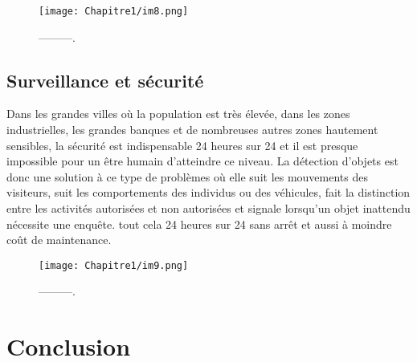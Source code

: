 \begin{figure}[H]
\centering
\texttt{[image: Chapitre1/im8.png]}
\caption{---------.}
\label{im8}
\end{figure}

\subsection{Surveillance et sécurité}
Dans les grandes villes où la population est très élevée, dans les zones industrielles, les grandes banques et de nombreuses autres zones hautement sensibles, la sécurité est indispensable 24 heures sur 24 et il est presque impossible pour un être humain d'atteindre ce niveau. La détection d'objets est donc une solution à ce type de problèmes où elle suit les mouvements des visiteurs, suit les comportements des individus ou des véhicules, fait la distinction entre les activités autorisées et non autorisées et signale lorsqu'un objet inattendu nécessite une enquête. tout cela 24 heures sur 24 sans arrêt et
aussi à moindre coût de maintenance.

\begin{figure}[H]
\centering
\texttt{[image: Chapitre1/im9.png]}
\caption{---------.}
\label{im9}
\end{figure}

\section{Conclusion}

